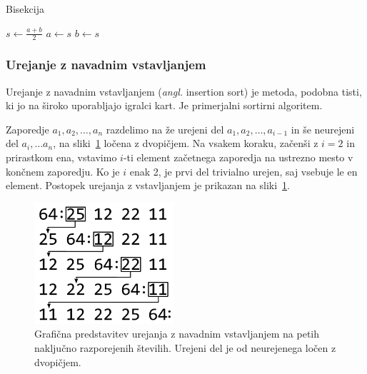 \documentclass[a4paper,oneside,12pt]{article}
\begin{document}
\begin{algorithm}[h!t!]
  \caption{Bisekcija}\label{algo:bisekcija}
  \begin{algorithmic}[1]
        \State $s \gets \frac{a+b}{2}$
          \State $a \gets s$
        \Else
          \State $b \gets s$
        \EndIf
    \EndWhile
  \end{algorithmic}
\end{algorithm}

\subsubsection{Urejanje z navadnim vstavljanjem}
\label{chapter:insertionsort}
Urejanje z navadnim vstavljanjem (\emph{angl.} insertion sort) je metoda,
podobna tisti, ki jo na široko uporabljajo igralci kart. Je primerjalni sortirni algoritem.

Zaporedje $a_1, a_2, \ldots, a_n$ razdelimo na že urejeni del $a_1, a_2, \ldots, a_{i-1}$
in še neurejeni del $a_i, \ldots a_n$, na sliki~\ref{fig:insertionsortimage}
ločena z dvopičjem. Na vsakem koraku, začenši z $i = 2$ in
prirastkom ena, vstavimo $i$-ti element začetnega zaporedja na ustrezno mesto v končnem
zaporedju. Ko je $i$ enak 2, je prvi del trivialno urejen, saj vsebuje le en element.
Postopek urejanja z vstavljanjem je prikazan na
sliki~\ref{fig:insertionsortimage}.

\begin{figure}[ht]
    \begin{center}
        \includegraphics[height=45mm]{slike/insertionsort.pdf}
    \end{center}
    \vspace{-0.7cm}
    \caption[Urejanje z vstavljanjem]{Grafična predstavitev urejanja z navadnim
    vstavljanjem na petih naključno razporejenih številih.
    Urejeni del je od neurejenega ločen z dvopičjem.}
    \label{fig:insertionsortimage}
\end{figure}
\end{document}
